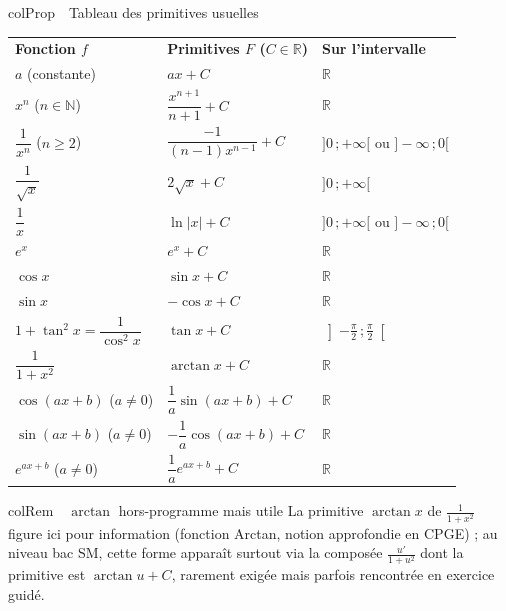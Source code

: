 \documentclass[11pt,a4paper]{article}
\newenvironment{propriete}[1][Propriété]
  {\begin{fiche}{colProp}{\ding{72}~~#1}}{\end{fiche}}
\newenvironment{remarque}[1][Remarque]
  {\begin{fiche}{colRem}{\ding{43}~~#1}}{\end{fiche}}
\begin{document}
\begin{propriete}[Tableau des primitives usuelles]
\begin{center}
\renewcommand{\arraystretch}{1.55}
\sffamily\small
\begin{tabular}{>{\centering\arraybackslash}p{4.5cm} >{\centering\arraybackslash}p{5.2cm} >{\centering\arraybackslash}p{5.2cm}}
\rowcolor{qtealdark} \color{white}\bfseries Fonction $f$ & \color{white}\bfseries Primitives $F$ ($C\in\mathbb{R}$) & \color{white}\bfseries Sur l'intervalle \\
\rowcolor{tealpale} $a$ (constante) & $ax+C$ & $\mathbb{R}$ \\
$x^n$ ($n\in\mathbb{N}$) & $\dfrac{x^{n+1}}{n+1}+C$ & $\mathbb{R}$ \\
\rowcolor{tealpale} $\dfrac{1}{x^n}$ ($n\geq2$) & $\dfrac{-1}{(n-1)x^{n-1}}+C$ & $]0\,;+\infty[$ ou $]-\infty\,;0[$ \\
$\dfrac{1}{\sqrt x}$ & $2\sqrt x+C$ & $]0\,;+\infty[$ \\
\rowcolor{tealpale} $\dfrac1x$ & $\ln|x|+C$ & $]0\,;+\infty[$ ou $]-\infty\,;0[$ \\
$e^x$ & $e^x+C$ & $\mathbb{R}$ \\
\rowcolor{tealpale} $\cos x$ & $\sin x+C$ & $\mathbb{R}$ \\
$\sin x$ & $-\cos x+C$ & $\mathbb{R}$ \\
\rowcolor{tealpale} $1+\tan^2x=\dfrac{1}{\cos^2x}$ & $\tan x+C$ & $\left]-\frac\pi2\,;\frac\pi2\right[$ \\
$\dfrac{1}{1+x^2}$ & $\arctan x+C$ & $\mathbb{R}$ \\
\rowcolor{tealpale} $\cos(ax+b)$ ($a\ne0$) & $\dfrac1a\sin(ax+b)+C$ & $\mathbb{R}$ \\
$\sin(ax+b)$ ($a\ne0$) & $-\dfrac1a\cos(ax+b)+C$ & $\mathbb{R}$ \\
\rowcolor{tealpale} $e^{ax+b}$ ($a\ne0$) & $\dfrac1ae^{ax+b}+C$ & $\mathbb{R}$ \\
\end{tabular}
\end{center}
\end{propriete}

\begin{remarque}[$\arctan$ hors-programme mais utile]
La primitive $\arctan x$ de $\frac{1}{1+x^2}$ figure ici pour information (fonction Arctan, notion approfondie en CPGE) ; au niveau bac SM, cette forme apparaît surtout via la composée $\frac{u'}{1+u^2}$ dont la primitive est $\arctan u+C$, rarement exigée mais parfois rencontrée en exercice guidé.
\end{remarque}
\end{document}

